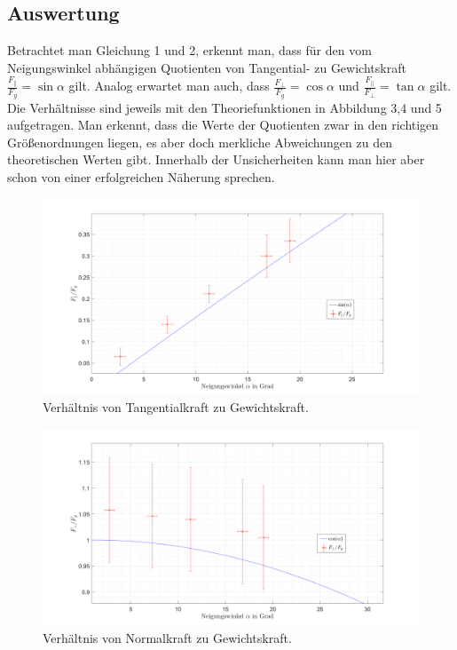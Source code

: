 \documentclass{article}
\begin{document}
\subsection{Auswertung}
Betrachtet man Gleichung 1 und 2, erkennt man, dass für den
vom Neigungswinkel abhängigen Quotienten von Tangential- zu Gewichtskraft $\frac{F_{\parallel}}{F_{g}} = \sin \alpha$ gilt. Analog erwartet man auch, dass $\frac{F_{\bot}}{F_{g}} = \cos \alpha$ und $\frac{F_{\parallel}}{F_{\bot}} = \tan \alpha$ gilt. Die Verhältnisse sind jeweils mit den Theoriefunktionen in Abbildung 3,4 und 5 aufgetragen.
Man erkennt, dass die Werte der Quotienten zwar in den richtigen Größenordnungen liegen, es aber doch merkliche Abweichungen zu den theoretischen Werten gibt. Innerhalb der Unsicherheiten kann man hier aber schon von einer erfolgreichen Näherung sprechen.
\begin{figure}[hbt!]
\centering
\includegraphics[width=470pt]{zerplot1.png}
\caption{Verhältnis von Tangentialkraft zu Gewichtskraft.}
\label{fig:length_eight_mouse}
\end{figure}
\begin{figure}[hbt!]
\centering
\includegraphics[width=470pt]{zerplot2.png}
\caption{Verhältnis von Normalkraft zu Gewichtskraft.}
\label{fig:length_eight_mouse}
\end{figure}
\end{document}
